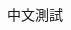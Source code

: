 \documentclass[a4paper]{article}
\begin{document}
\begin{CJK}{UTF8}{}

中文測試

\end{CJK}
\end{document}

